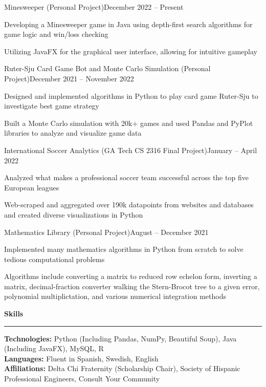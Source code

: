 \documentclass{article}
\newcommand{\horizontal}{\vspace{3pt}\hrule}
\newcommand{\sectitle}[1]{\vspace{3pt} \textbf{\large #1} \horizontal}
\newcommand{\skill}[2]{\textbf{#1:} #2}
\begin{document}
\begin{flushleft}
    \begin{subexperience}{Minesweeper (Personal Project)}{December 2022 -- Present}
        \item Developing a Minesweeper game in Java using depth-first search algorithms for game logic and win/loss checking
        \item Utilizing JavaFX for the graphical user interface, allowing for intuitive gameplay
    \end{subexperience}

    \begin{subexperience}{Ruter-Sju Card Game Bot and Monte Carlo Simulation (Personal Project)}{December 2021 -- November 2022}
        \item Designed and implemented algorithms in Python to play card game Ruter-Sju to investigate best game strategy
        \item Built a Monte Carlo simulation with 20k+ games and used Pandas and PyPlot libraries to analyze and visualize game data
    \end{subexperience}

    \begin{subexperience}{International Soccer Analytics (GA Tech CS 2316 Final Project)}{January -- April 2022}
        \item Analyzed what makes a professional soccer team successful across the top five European leagues
        \item Web-scraped and aggregated over 190k datapoints from websites and databases and created diverse visualizations in Python
    \end{subexperience}

    \begin{subexperience}{Mathematics Library (Personal Project)}{August -- December 2021}
        \item Implemented many mathematics algorithms in Python from scratch to solve tedious computational problems
        \item Algorithms include converting a matrix to reduced row echelon form, inverting a matrix, decimal-fraction converter walking the Stern-Brocot tree to a given error, polynomial multiplictation, and various numerical integration methods
    \end{subexperience}

\sectitle{Skills}

    \vspace{3pt}
    \skill{Technologies}{Python (Including Pandas, NumPy, Beautiful Soup), Java (Including JavaFX), MySQL, R} \\
    \skill{Languages}{Fluent in Spanish, Swedish, English} \\
    \skill{Affiliations}{Delta Chi Fraternity (Scholarship Chair), Society of Hispanic Professional Engineers, Consult Your Community}

\end{flushleft}
\end{document}
